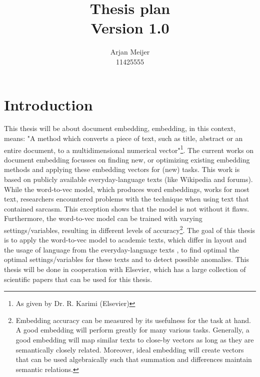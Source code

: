 \documentclass[10pt,a4paper]{article}
\begin{document}
\begin{titlepage}
\title{Thesis plan\\Version 1.0}
\author{Arjan Meijer\\11425555}
\maketitle
\thispagestyle{empty}
\end{titlepage}
\tableofcontents\newpage
\section{Introduction}
This thesis will be about document embedding, embedding, in this context, means: "A method which converts a piece of text, such as title, abstract or an entire document, to a multidimensional numerical vector"\footnote{As given by Dr. R. Karimi (Elsevier)}. The current works on document embedding focusses on finding new, or optimizing existing embedding methods and applying these embedding vectors for (new) tasks. This work is based on publicly available everyday-language texts (like Wikipedia and forums). While the word-to-vec model, which produces word embeddings, works for most text, researchers encountered problems with the technique when using text that contained sarcasm\cite{le2014distributed}. This exception shows that the model is not without it flaws. Furthermore, the word-to-vec model can be trained with varying settings/variables, resulting in different levels of accuracy\footnote{Embedding accuracy can be measured by its usefulness for the task at hand.  A good embedding will perform greatly for many various tasks. Generally, a good embedding will map similar texts to close-by vectors as long as they are semantically closely related. Moreover, ideal embedding will create vectors that can be used algebraically such that summation and differences maintain semantic relations.}. The goal of this thesis is to apply the word-to-vec model to academic texts, which differ in layout and the usage of language from the everyday-language texts , to find optimal the optimal settings/variables for these texts and to detect possible anomalies. This thesis will be done in cooperation with Elsevier, which has a large collection of scientific papers that can be used for this thesis.
\newpage
\end{document}

